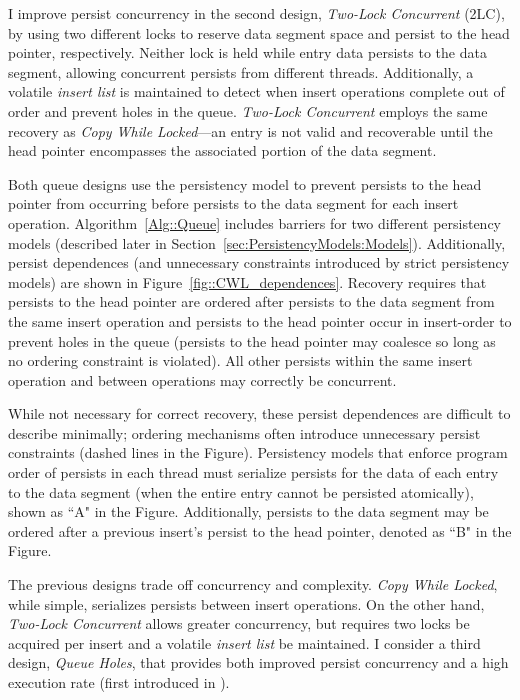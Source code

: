 I improve persist concurrency in the second design, \emph{Two-Lock Concurrent} (2LC), by using two different locks to reserve data segment space and persist to the head pointer, respectively.
Neither lock is held while entry data persists to the data segment, allowing concurrent persists from different threads.
Additionally, a volatile \emph{insert list} is maintained to detect when insert operations complete out of order and prevent holes in the queue.
\emph{Two-Lock Concurrent} employs the same recovery as \emph{Copy While Locked}---an entry is not valid and recoverable until the head pointer encompasses the associated portion of the data segment.



Both queue designs use the persistency model to prevent persists to the head pointer from occurring before persists to the data segment for each insert operation.
Algorithm~\ref{Alg::Queue} includes barriers for two different persistency models (described later in Section~\ref{sec:PersistencyModels:Models}).
Additionally, persist dependences (and unnecessary constraints introduced by strict persistency models) are shown in Figure~\ref{fig::CWL_dependences}.
Recovery requires that persists to the head pointer are ordered after persists to the data segment from the same insert operation and persists to the head pointer occur in insert-order to prevent holes in the queue (persists to the head pointer may coalesce so long as no ordering constraint is violated).
All other persists within the same insert operation and between operations may correctly be concurrent.

While not necessary for correct recovery, these persist dependences are difficult to describe minimally; ordering mechanisms often introduce unnecessary persist constraints (dashed lines in the Figure).
Persistency models that enforce program order of persists in each thread must serialize persists for the data of each entry to the data segment (when the entire entry cannot be persisted atomically), shown as ``A" in the Figure.
Additionally, persists to the data segment may be ordered after a previous insert's persist to the head pointer, denoted as ``B" in the Figure.

The previous designs trade off concurrency and complexity.
\emph{Copy While Locked}, while simple, serializes persists between insert operations.
On the other hand, \emph{Two-Lock Concurrent} allows greater concurrency, but requires two locks be acquired per insert and a volatile \emph{insert list} be maintained.
I consider a third design, \emph{Queue Holes}, that provides both improved persist concurrency and a high execution rate (first introduced in \cite{FangHsiao11}).

